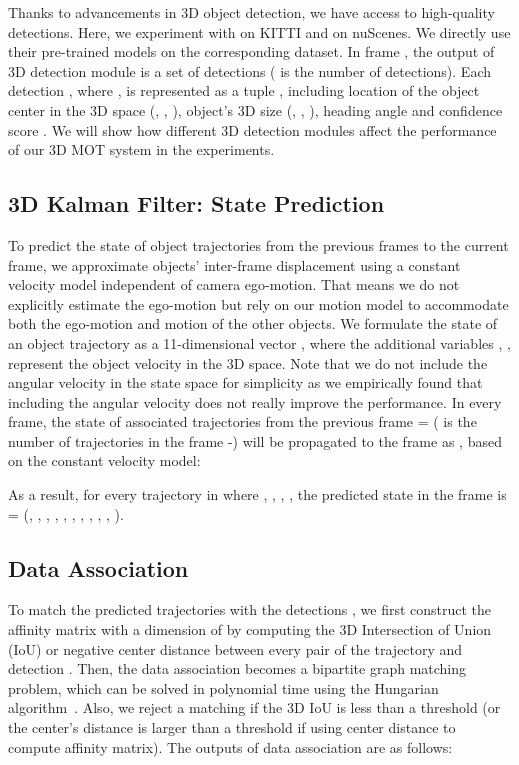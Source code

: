 \documentclass[letterpaper, 10 pt, conference]{ieeeconf}
\begin{document}
Thanks to advancements in 3D object detection, we have access to high-quality detections. Here, we experiment with \cite{Shi2019, Weng2019} on KITTI and \cite{Zhu2019} on nuScenes. We directly use their pre-trained models on the corresponding dataset. In frame , the output of 3D detection module is a set of detections  ( is the number of detections). Each detection , where , is represented as a tuple , including location of the object center in the 3D space (, , ), object's 3D size (, , ), heading angle  and confidence score . We will show how different 3D detection modules affect the performance of our 3D MOT system in the experiments.

\subsection{3D Kalman Filter: State Prediction}

To predict the state of object trajectories from the previous frames to the current frame, we approximate objects' inter-frame displacement using a constant velocity model independent of camera ego-motion. That means we do not explicitly estimate the ego-motion but rely on our motion model to accommodate both the ego-motion and motion of the other objects. We formulate the state of an object trajectory as a 11-dimensional vector , where the additional variables , ,  represent the object velocity in the 3D space. Note that we do not include the angular velocity  in the state space for simplicity as we empirically found that including the angular velocity does not really improve the performance. In every frame, the state of associated trajectories from the previous frame = ( is the number of trajectories in the frame -) will be propagated to the frame  as , based on the constant velocity model:
\vspace{-0.3cm}


As a result, for every trajectory  in  where   , , , , the predicted state in the frame  is  = (, , , , , , , , , , ).

\subsection{Data Association}\label{sec:association}

To match the predicted trajectories  with the detections , we first construct the affinity matrix with a dimension of  by computing the 3D Intersection of Union (IoU) or negative center distance between every pair of the trajectory  and detection . Then, the data association becomes a bipartite graph matching problem, which can be solved in polynomial time using the Hungarian algorithm~\cite{WKuhn1955}. Also, we reject a matching if the 3D IoU is less than a threshold  (or the center's distance is larger than a threshold  if using center distance to compute affinity matrix). The outputs of data association are as follows:
\end{document}
